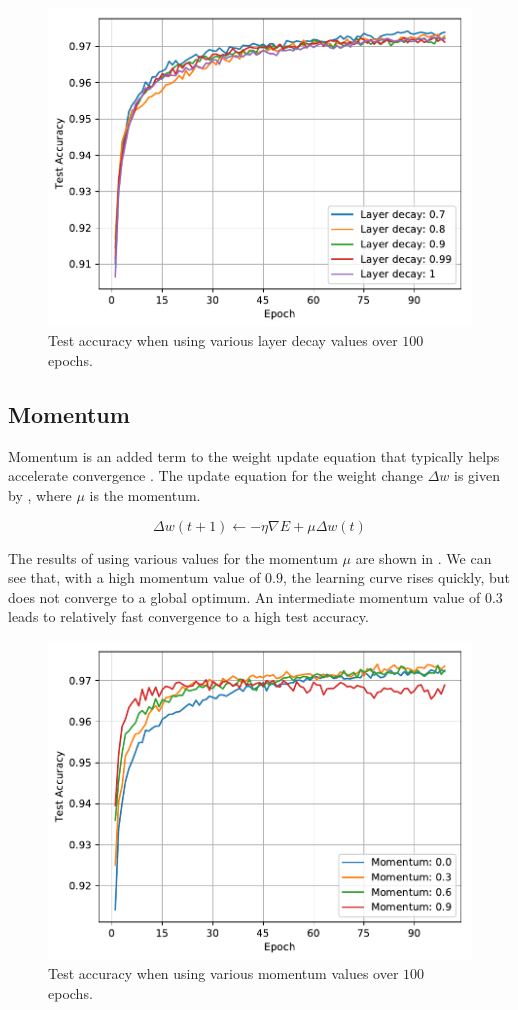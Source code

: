 \documentclass[journal,hidelinks]{IEEEtran}
\begin{document}
\begin{figure}[!htb]
  \centering
  \includegraphics[width=0.8\columnwidth]{plots/layer_decay_zoom.pdf}
  \caption{Test accuracy when using various layer decay values over $100$ epochs.}
  \label{fig:layer_decay_zoom}
\end{figure}

\subsection{Momentum}

Momentum is an added term to the weight update equation that typically helps accelerate convergence \cite{lecun_efficient_1998}. The update equation for the weight change $\Delta w$ is given by , where $\mu$ is the momentum.

\begin{equation} \label{eq:momentum}
\Delta w(t + 1) \leftarrow - \eta \nabla E + \mu \Delta w(t)
\end{equation}

The results of using various values for the momentum $\mu$ are shown in . We can see that, with a high momentum value of $0.9$, the learning curve rises quickly, but does not converge to a global optimum. An intermediate momentum value of $0.3$ leads to relatively fast convergence to a high test accuracy.

\begin{figure}[!htb]
  \centering
  \includegraphics[width=0.8\columnwidth]{plots/momentum_zoom.pdf}
  \caption{Test accuracy when using various momentum values over $100$ epochs.}
  \label{fig:momentum}
\end{figure}
\end{document}
